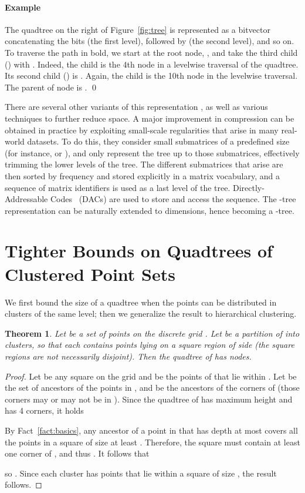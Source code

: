 \documentclass{elsarticle}
\newtheorem{theorem}{Theorem}
\newenvironment{example}{\paragraph{Example}}{\qed \medskip }
\begin{document}
\begin{example}
The quadtree on the right of Figure~\ref{fig:tree} is represented as a bitvector  concatenating the bits  (the first level), followed by  (the second level), and so on. To traverse the path in bold, we start at the
root node, , and take the third child () with 
. Indeed, the child is the 4th node in a
levelwise traversal of the quadtree. Its second child () is
. Again, the child is the 10th node in the
levelwise traversal. The parent of node  is .
\end{example}




There are several other variants of this representation \cite{VM14,BCBNP20}, as well as various techniques to further reduce space.
A major improvement in compression \cite{BLN14} can be obtained in practice by exploiting small-scale regularities that arise in many real-world datasets. To do this, they consider small submatrices of a predefined size (for instance,  or ), and only represent the tree up to those submatrices, effectively trimming the lower levels of the tree. The different submatrices that arise are then sorted by frequency and stored explicitly in a matrix vocabulary, and a sequence of matrix identifiers is used as a last level of the tree. Directly-Addressable Codes~\cite{BLN13} (DACs) are used to store and access the sequence.
The -tree representation can be naturally extended to  dimensions, hence becoming a 
-tree.





\section{Tighter Bounds on Quadtrees of Clustered Point Sets}
\label{sec:space}

We first bound the size of a quadtree when the points can be distributed in  clusters of the same level; then we generalize the result to hierarchical clustering.

\begin{theorem}
\label{thm:space}
Let  be a set of points on the discrete grid .
Let  be a partition of
 into  clusters, so that each
 contains  points lying on a square region of
side  (the square regions are not necessarily disjoint).
Then the quadtree of  has  nodes.
\end{theorem}

\begin{proof}
Let  be any  square on the grid and
 be the points of  that lie within . 
Let  be the set of ancestors of the points in , and
 be the ancestors of the corners of  (those corners may or may not 
be in ). Since the quadtree of  has maximum height 
and  has 4 corners, it holds 


By Fact~\ref{fact:basics},
any ancestor  of a point in  that has depth at most 
covers all the points in a square of size at least .  
Therefore, the square must contain at least one corner of , and thus .  It follows that

so .
Since each cluster  has  points that lie within a square of
size , the result follows.
\end{proof}
\end{document}
